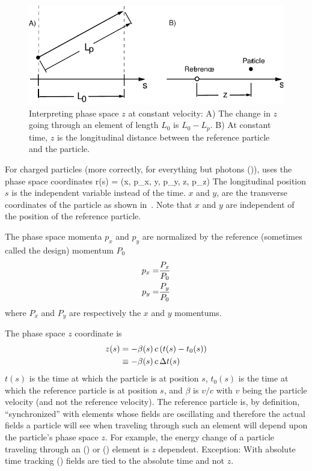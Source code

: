 \begin{figure}
\centering 
\includegraphics{canonical-z.pdf} 
\caption[Interpreting phase space $z$ at constant velocity.]
{Interpreting phase space $z$ at constant velocity: A) The change in $z$
going through an element of length $L_0$ is $L_0 - L_p$.  B) At
constant time, $z$ is the longitudinal distance between the reference
particle and the particle.}
\label{f:canonical.z}
\end{figure}

For charged particles (more correctly, for everything but photons
()), \bmad uses the phase space coordinates
\Begineq
  \Bf r(s) = (x, p_x, y, p_y, z, p_z)
\Endeq
The longitudinal position $s$ is the independent variable instead of
the time. $x$ and $y$, are the transverse coordinates of the particle
as shown in~. Note that $x$ and $y$ are independent
of the position of the reference particle.

The phase space momenta $p_x$ and $p_y$ are normalized by the
reference (sometimes called the design) momentum $P_0$
\begin{align}
  p_x = &\frac{P_x}{P_0} \nonumber \\
  p_y = &\frac{P_y}{P_0}
  \label{ppp}
\end{align}
where $P_x$ and $P_y$ are respectively the $x$ and $y$ momentums.

The phase space $z$ coordinate is 
\begin{align}
  z(s) &= -\beta(s) \, c \, (t(s) - t_0(s)) \nonumber \\
    &\equiv - \beta(s) \, c \, \Delta t(s)
  \label{zbctt}
\end{align}
$t(s)$ is the time at which the particle is at position $s$, $t_0(s)$
is the time at which the reference particle is at position $s$, and
$\beta$ is $v/c$ with $v$ being the particle velocity (and not the
reference velocity). The reference particle is, by definition,
``synchronized'' with elements whose fields are oscillating and
therefore the actual fields a particle will see when traveling through
such an element will depend upon the particle's phase space $z$. For
example, the energy change of a particle traveling through an
 () or  () element
is $z$ dependent. Exception: With absolute time tracking
() fields are tied to the absolute time and not $z$.

